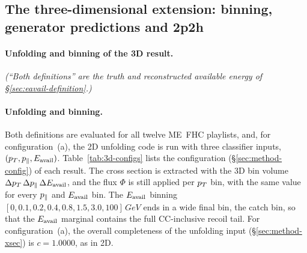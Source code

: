 \subsection{The three-dimensional extension: binning, generator predictions and 2p2h}\label{recsec:higherdim-3d}


\paragraph{Unfolding and binning of the 3D result.} \noindent\emph{(``Both definitions'' are the truth and reconstructed available energy of \S\ref{sec:eavail-definition}.)}

\paragraph{Unfolding and binning.} Both definitions are evaluated for all twelve ME~FHC playlists, and, for configuration~(a), the 2D unfolding code is run with three classifier inputs, $(p_{T},p_{\parallel},E_{\mathrm{avail}})$. Table~\ref{tab:3d-configs} lists the configuration (\S\ref{sec:method-config}) of each result. The cross section is extracted with the 3D bin volume $\Delta p_{T}\,\Delta p_{\parallel}\,\Delta E_{\mathrm{avail}}$, and the flux $\Phi$ is still applied per $p_{T}$ bin, with the same value for every $p_{\parallel}$ and $E_{\mathrm{avail}}$ bin. The $E_{\mathrm{avail}}$ binning $[0,0.1,0.2,0.4,0.8,1.5,3.0,100]\,\si{GeV}$ ends in a wide final bin, the catch bin, so that the $E_{\mathrm{avail}}$ marginal contains the full CC-inclusive recoil tail. For configuration~(a), the overall completeness of the unfolding input (\S\ref{sec:method-xsec}) is $c=1.0000$, as in 2D.


